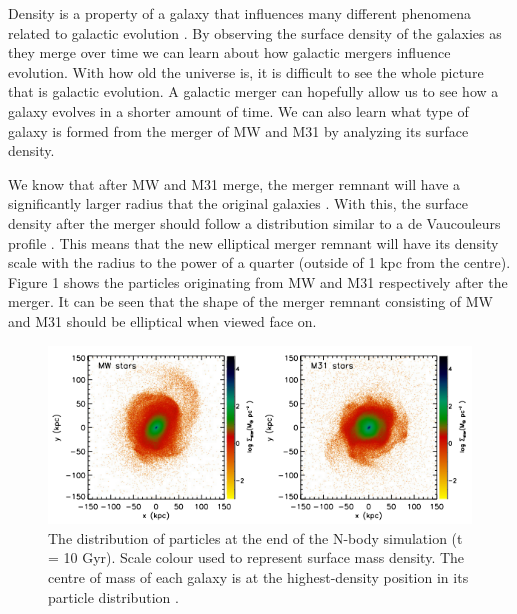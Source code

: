 \documentclass[linenumbers,trackchanges]{aastex7}
\begin{document}
Density is a property of a galaxy that influences many different phenomena
related to galactic evolution \citep{Torrey_Cox_Kewley_Hernquist_2012}. By
observing the surface density of the galaxies as they merge over time we can
learn about how galactic mergers influence evolution. With how old the
universe is, it is difficult to see the whole picture that is galactic
evolution. A galactic merger can hopefully allow us to see how a galaxy
evolves in a shorter amount of time. We can also learn what type of galaxy is
formed from the merger of MW and M31 by analyzing its surface density.

We know that after MW and M31 merge, the merger remnant will have a
significantly larger radius that the original galaxies
\citep{van_der_Marel_Besla_Cox_Sohn_Anderson_2012}. With this, the surface
density after the merger should follow a distribution similar to a de
Vaucouleurs profile \citep{Brooks_Christensen_2016}. This means that the new
elliptical merger remnant will have its density scale with the radius to the
power of a quarter (outside of 1 kpc from the centre). Figure 1 shows the
particles originating from MW and M31 respectively after the merger. It
can be seen that the shape of the merger remnant consisting of MW and M31
should be elliptical when viewed face on.

\begin{figure}[h!]
\centering
\includegraphics[scale=0.75]{van_der_Marel_et_al_Figure.png}
\caption{The distribution of particles at the end of the N-body simulation (t = 10 Gyr). Scale colour used to represent surface mass density. The centre of mass of each galaxy is at the highest-density position in its particle distribution \citep{van_der_Marel_Besla_Cox_Sohn_Anderson_2012}.
\label{fig:general}}
\end{figure}
\end{document}
